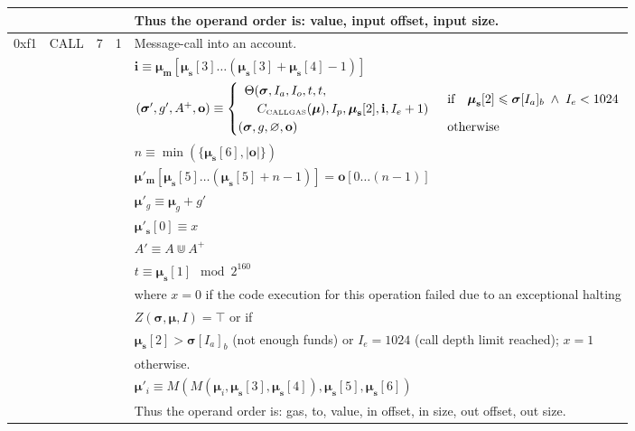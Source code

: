 \documentclass[9pt,oneside]{amsart}
\begin{document}
\begin{tabular*}{\columnwidth}[h]{rlrrl}
&&&& Thus the operand order is: value, input offset, input size. \\
\midrule
0xf1 & {\small CALL} & 7 & 1 & Message-call into an account. \\
&&&& $\mathbf{i} \equiv \boldsymbol{\mu}_\mathbf{m}[ \boldsymbol{\mu}_\mathbf{s}[3] \dots (\boldsymbol{\mu}_\mathbf{s}[3] + \boldsymbol{\mu}_\mathbf{s}[4] - 1) ]$ \\
&&&& $(\boldsymbol{\sigma}', g', A^+, \mathbf{o}) \equiv \begin{cases}\begin{array}{l}\Theta(\boldsymbol{\sigma}, I_a, I_o, t, t,\\ \quad C_{\text{\tiny CALLGAS}}(\boldsymbol{\mu}), I_p, \boldsymbol{\mu}_\mathbf{s}[2], \mathbf{i}, I_e + 1)\end{array} & \text{if} \quad \boldsymbol{\mu}_\mathbf{s}[2] \leqslant \boldsymbol{\sigma}[I_a]_b \;\wedge\; I_e < 1024\\ (\boldsymbol{\sigma}, g, \varnothing, \mathbf{o}) & \text{otherwise} \end{cases}$ \\
&&&& $n \equiv \min(\{ \boldsymbol{\mu}_\mathbf{s}[6], |\mathbf{o}|\})$ \\
&&&& $\boldsymbol{\mu}'_\mathbf{m}[ \boldsymbol{\mu}_\mathbf{s}[5] \dots (\boldsymbol{\mu}_\mathbf{s}[5] + n - 1) ] = \mathbf{o}[0 \dots (n - 1)]$ \\
&&&& $\boldsymbol{\mu}'_g \equiv \boldsymbol{\mu}_g + g'$ \\
&&&& $\boldsymbol{\mu}'_\mathbf{s}[0] \equiv x$ \\
&&&& $A' \equiv A \Cup A^+$ \\
&&&& $t \equiv \boldsymbol{\mu}_\mathbf{s}[1] \mod 2^{160}$ \\
&&&& where $x=0$ if the code execution for this operation failed due to an exceptional halting \\
&&&& $Z(\boldsymbol{\sigma}, \boldsymbol{\mu}, I) = \top$ or if  \\
&&&& $\boldsymbol{\mu}_\mathbf{s}[2] > \boldsymbol{\sigma}[I_a]_b$ (not enough funds) or $I_e = 1024$ (call depth limit reached); $x=1$ \\
&&&& otherwise. \\
&&&& $\boldsymbol{\mu}'_i \equiv M(M(\boldsymbol{\mu}_i, \boldsymbol{\mu}_\mathbf{s}[3], \boldsymbol{\mu}_\mathbf{s}[4]), \boldsymbol{\mu}_\mathbf{s}[5], \boldsymbol{\mu}_\mathbf{s}[6])$ \\
&&&& Thus the operand order is: gas, to, value, in offset, in size, out offset, out size. \\

\end{tabular*}
\end{document}
